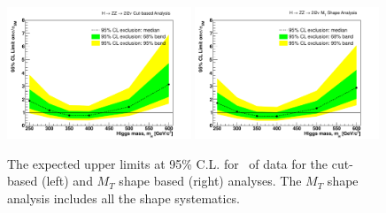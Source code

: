 \begin{figure}[!htbp]
\begin{center}
   \includegraphics[width=0.49\textwidth]{figures/limits_cut_4fb.pdf}
   \includegraphics[width=0.49\textwidth]{figures/limits_mtshape_4fb.pdf}
   \caption{ The expected upper limits at 95\% C.L. for \intlumi\ of data for the cut-based (left) and $M_T$ shape based (right) analyses. The $M_T$ shape analysis includes all the shape systematics. }
   \label{fig:limits_4fb}
\end{center}
\end{figure}
